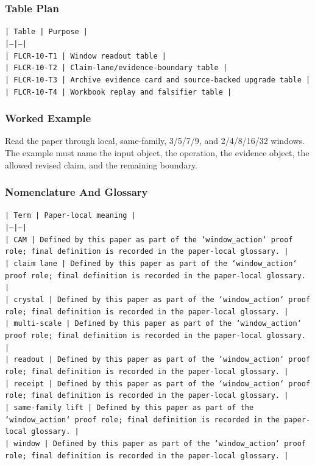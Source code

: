 \documentclass[11pt]{article}
\begin{document}
\subsubsection*{Table Plan}

\noindent\texttt{| Table | Purpose |}\\
\noindent\texttt{|---|---|}\\
\noindent\texttt{| FLCR-10-T1 | Window readout table |}\\
\noindent\texttt{| FLCR-10-T2 | Claim-lane/evidence-boundary table |}\\
\noindent\texttt{| FLCR-10-T3 | Archive evidence card and source-backed upgrade table |}\\
\noindent\texttt{| FLCR-10-T4 | Workbook replay and falsifier table |}\\

\subsubsection*{Worked Example}

Read the paper through local, same-family, 3/5/7/9, and 2/4/8/16/32 windows. The example must name the input object, the operation,
the evidence object, the allowed revised claim, and the remaining boundary.

\subsubsection*{Nomenclature And Glossary}

\noindent\texttt{| Term | Paper-local meaning |}\\
\noindent\texttt{|---|---|}\\
\noindent\texttt{| CAM | Defined by this paper as part of the `window\_action` proof role; final definition is recorded in the paper-local glossary. |}\\
\noindent\texttt{| claim lane | Defined by this paper as part of the `window\_action` proof role; final definition is recorded in the paper-local glossary. |}\\
\noindent\texttt{| crystal | Defined by this paper as part of the `window\_action` proof role; final definition is recorded in the paper-local glossary. |}\\
\noindent\texttt{| multi-scale | Defined by this paper as part of the `window\_action` proof role; final definition is recorded in the paper-local glossary. |}\\
\noindent\texttt{| readout | Defined by this paper as part of the `window\_action` proof role; final definition is recorded in the paper-local glossary. |}\\
\noindent\texttt{| receipt | Defined by this paper as part of the `window\_action` proof role; final definition is recorded in the paper-local glossary. |}\\
\noindent\texttt{| same-family lift | Defined by this paper as part of the `window\_action` proof role; final definition is recorded in the paper-local glossary. |}\\
\noindent\texttt{| window | Defined by this paper as part of the `window\_action` proof role; final definition is recorded in the paper-local glossary. |}\\
\end{document}
